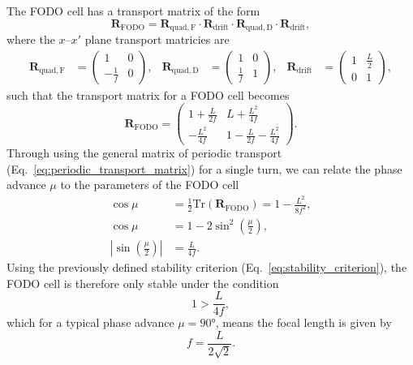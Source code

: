 \documentclass[../main.tex]{subfiles}
\begin{document}
The FODO cell has a transport matrix of the form
\begin{equation}
\boldsymbol{R}_{\mathrm{FODO}} = \boldsymbol{R}_{\mathrm{quad,F}}\cdot\boldsymbol{R}_{\mathrm{drift}}\cdot\boldsymbol{R}_{\mathrm{quad,D}}\cdot\boldsymbol{R}_{\mathrm{drift}},
\label{eq:FODO_transport}    
\end{equation}
where the $x$--$x'$ plane transport matricies are
\begin{align}
\boldsymbol{R}_{\mathrm{quad,F}} &= 
\begin{pmatrix}
1 & 0 \\
-\frac{1}{f} & 0
\end{pmatrix}, & \boldsymbol{R}_{\mathrm{quad,D}} &= 
\begin{pmatrix}
1 & 0 \\
\frac{1}{f} & 1
\end{pmatrix}, & \boldsymbol{R}_{\mathrm{drift}} &= 
\begin{pmatrix}
1 & \frac{L}{2} \\
0 & 1
\end{pmatrix},
\label{eq:FODO_component_matricies}    
\end{align}
such that the transport matrix for a FODO cell becomes
\begin{equation}
\boldsymbol{R}_{\mathrm{FODO}} =
\begin{pmatrix}
1+\frac{L}{2f} & L+\frac{L^{2}}{4f} \\
-\frac{L^{2}}{4f} & 1-\frac{L}{2f}-\frac{L^{2}}{4f}
\end{pmatrix}.
\label{eq:FODO_matrix}
\end{equation}
Through using the general matrix of periodic transport (Eq.~\ref{eq:periodic_transport_matrix}) for a single turn, we can relate the phase advance $\mu$ to the parameters of the FODO cell
\begin{align}
\cos\mu &= \frac{1}{2}\boldsymbol{\mathrm{Tr}}\left(\boldsymbol{R}_{\mathrm{FODO}}\right) = 1-\frac{L^{2}}{8f^{2}}, \\
\cos\mu &= 1-2\sin^{2}\left(\frac{\mu}{2}\right), \\
\left|\sin\left(\frac{\mu}{2}\right)\right| &= \frac{L}{4f}.
\label{eq:phase_advance_FODO}
\end{align}
Using the previously defined stability criterion (Eq.~\ref{eq:stability_criterion}), the FODO cell is therefore only stable under the condition
\begin{equation}
1>\frac{L}{4f},
\label{eq:FODO_stability}    
\end{equation}
which for a typical phase advance $\mu=90$\si{\degree}, means the focal length is given by
\begin{equation}
f=\frac{L}{2\sqrt{2}}.
\label{eq:FODO_focal_90}    
\end{equation}
\end{document}

